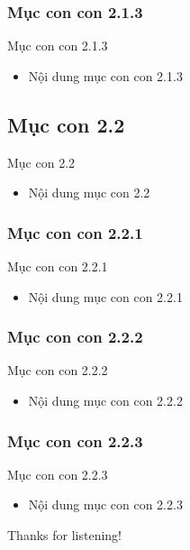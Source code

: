 \documentclass{beamer}
\begin{document}
\subsubsection{Mục con con 2.1.3}
\begin{frame}{Mục con con 2.1.3}
\begin{itemize}
\item Nội dung mục con con 2.1.3
\end{itemize}
\end{frame}

\subsection{Mục con 2.2}
\begin{frame}{Mục con 2.2}
\begin{itemize}
\item Nội dung mục con 2.2
\end{itemize}
\end{frame}

\subsubsection{Mục con con 2.2.1}
\begin{frame}{Mục con con 2.2.1}
\begin{itemize}
\item Nội dung mục con con 2.2.1
\end{itemize}
\end{frame}

\subsubsection{Mục con con 2.2.2}
\begin{frame}{Mục con con 2.2.2}
\begin{itemize}
\item Nội dung mục con con 2.2.2
\end{itemize}
\end{frame}

\subsubsection{Mục con con 2.2.3}
\begin{frame}{Mục con con 2.2.3}
\begin{itemize}
\item Nội dung mục con con 2.2.3
\end{itemize}
\end{frame}

\begin{frame}{}
\centering
\Huge{Thanks for listening!}
\end{frame}
\end{document}
